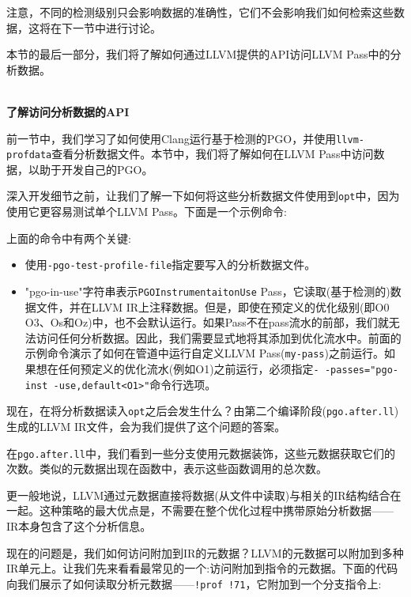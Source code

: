 注意，不同的检测级别只会影响数据的准确性，它们不会影响我们如何检索这些数据，这将在下一节中进行讨论。

本节的最后一部分，我们将了解如何通过LLVM提供的API访问LLVM Pass中的分析数据。

\hspace*{\fill} \\ %
\noindent
\textbf{了解访问分析数据的API}

前一节中，我们学习了如何使用Clang运行基于检测的PGO，并使用\texttt{llvm-profdata}查看分析数据文件。本节中，我们将了解如何在LLVM Pass中访问数据，以助于开发自己的PGO。

深入开发细节之前，让我们了解一下如何将这些分析数据文件使用到\texttt{opt}中，因为使用它更容易测试单个LLVM Pass。下面是一个示例命令:


上面的命令中有两个关键:

\begin{itemize}
\item 使用\texttt{-pgo-test-profile-file}指定要写入的分析数据文件。

\item "pgo-in-use"字符串表示\texttt{PGOInstrumentaitonUse} Pass，它读取(基于检测的)数据文件，并在LLVM IR上注释数据。但是，即使在预定义的优化级别(即O0 ~ O3、Os和Oz)中，也不会默认运行。如果Pass不在pass流水的前部，我们就无法访问任何分析数据。因此，我们需要显式地将其添加到优化流水中。前面的示例命令演示了如何在管道中运行自定义LLVM Pass(\texttt{my-pass})之前运行。如果想在任何预定义的优化流水(例如O1)之前运行，必须指定\texttt{-\,-passes="pgo-inst -use,default<O1>"}命令行选项。
\end{itemize}

现在，在将分析数据读入\texttt{opt}之后会发生什么？由第二个编译阶段(\texttt{pgo.after.ll})生成的LLVM IR文件，会为我们提供了这个问题的答案。

在\texttt{pgo.after.ll}中，我们看到一些分支使用元数据装饰，这些元数据获取它们的次数。类似的元数据出现在函数中，表示这些函数调用的总次数。

更一般地说，LLVM通过元数据直接将数据(从文件中读取)与相关的IR结构结合在一起。这种策略的最大优点是，不需要在整个优化过程中携带原始分析数据——IR本身包含了这个分析信息。

现在的问题是，我们如何访问附加到IR的元数据？LLVM的元数据可以附加到多种IR单元上。让我们先来看看最常见的一个:访问附加到指令的元数据。下面的代码向我们展示了如何读取分析元数据——\texttt{!prof !71}，它附加到一个分支指令上:

